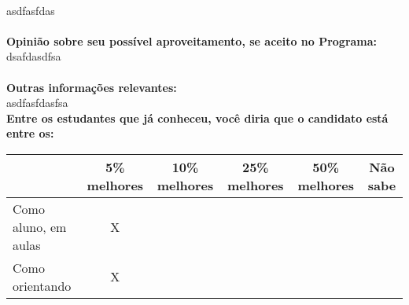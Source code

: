 \documentclass[11pt]{article}
\begin{document}
\\asdfasfdas\\
\\
\textbf{Opinião sobre seu possível aproveitamento, se aceito no Programa:}
\\dsafdasdfsa\\ 
\\
\textbf{Outras informações relevantes:} \\asdfasfdasfsa
\\[0.3cm]
\textbf{Entre os estudantes que já conheceu, você diria que o candidato está entre os:}
\\
\begin{tabular}{|l|c|c|c|c|c|}
\hline
 & 5\% melhores & 10\% melhores & 25\% melhores & 50\% melhores & Não sabe \\
\hline
Como aluno, em aulas & X &  &  &  & \\
\hline
Como orientando & X &  &  &  & \\
\hline
\end{tabular}
\end{document}
